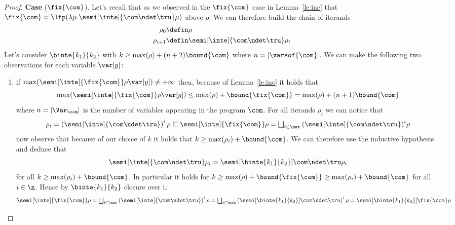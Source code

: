 \begin{proof}
  \medskip
  
  \noindent
  \textbf{Case} (\(\fix{\com}\)).
  Let's recall that as we observed in the \(\fix{\com}\) case in
  Lemma~\ref{le:inc} that
  \({\fix{\com} = \lfp(\lambda \mu . \semi[\inte]{\com \ndet
      \tru}\mu)}\) above \(\rho\). We can therefore build the chain of
  iterands
  \begin{align*}
    \rho_0 & \defin \rho \\
    \rho_{i+1} & \defin \semi[\inte]{\com \ndet \tru}\rho_i
  \end{align*}
  Let's consider \(\binte{k_1}{k_2}\) with
  \(k \geq \max(\rho) + (n+2)\bound{\com}\) where
  \(n = |\varsof{\com}|\). We can make the following two observations
  for each variable \(\var[y]\):
  \begin{enumerate}[label=(\roman*)]
  \item if
    \({\max(\semi[\inte]{\fix{\com}}\rho\var[y])} \neq +\infty\) then,
    because of Lemma~\ref{le:inc} it holds that
    \begin{equation*}
      \max(\semi[\inte]{\fix{\com}}\rho\var[y]) \leq \max(\rho) + \bound{\fix{\com}} = \max(\rho) + (n+1)\bound{\com}
    \end{equation*}
    where \(n = |\Var_{\com}|\) is the number of variables appearing
    in the program \(\com\). For all iterands \(\rho_i\) we can notice
    that
    \begin{equation*}
      \rho_i = \left(\semi[\inte]{\com \ndet \tru}\right)^i\rho \sqsubseteq \semi[\inte]{\fix{\com}}\rho = \textstyle\bigsqcup_{i\in\nat}{\left(\semi[\inte]{\com\ndet\tru}\right)}^i\rho
    \end{equation*}
    now observe that because of our choice of \(k\) it holds that
    \({k \geq \max(\rho_i) + \bound{\com}}\). We can therefore use the
    inductive hypothesis and deduce that
    \begin{equation*}
      \semi[\inte]{\com\ndet\tru}\rho_i = \semi[\binte{k_1}{k_2}]{\com\ndet\tru}\rho_i
    \end{equation*}
    for all \(k \geq \max(\rho_i) + \bound{\com}\). In particular it
    holds for
    \(k \geq \max(\rho) + \bound{\fix{\com}} \geq \max(\rho_i) +
    \bound{\com}\) for all \(i\in\n\). Hence by \(\binte{k_1}{k_2}\) closure
    over \(\sqcup\)
    \begin{equation*}
      \semi[\inte]{\fix{\com}}\rho
      =
      \textstyle\bigsqcup_{i\in\nat}\left(\semi[\inte]{\com\ndet\tru}\right)^i\rho
      =
      \textstyle\bigsqcup_{i\in\nat}\left(\semi[\binte{k_1}{k_2}]{\com\ndet\tru}\right)^i\rho
      =
      \semi[\binte{k_1}{k_2}]{\fix{\com}}\rho
    \end{equation*}
    

\end{enumerate}
\end{proof}
